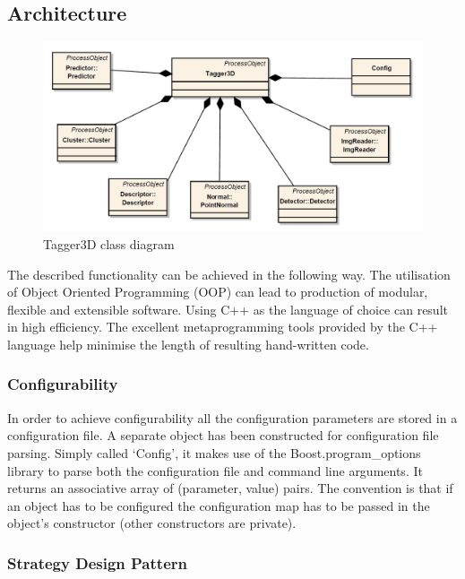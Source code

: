 	\subsection{Architecture}
	
	\begin{figure}[ht]
	\centering
	\includegraphics[width=1.0\textwidth]{figs/short}
	\caption{Tagger3D class diagram}
	\label{fig:class_diagram}
	\end{figure}
	
	The described functionality can be achieved in the following way. The utilisation of Object Oriented Programming (OOP) can lead to production of modular, flexible and extensible software. Using C++ as the language of choice can result in high efficiency. The excellent metaprogramming tools provided by the C++ language help minimise the length of resulting hand-written code.
	
	\subsubsection{Configurability}
	In order to achieve configurability all the configuration parameters are stored in a configuration file. A separate object has been constructed for configuration file parsing. Simply called `Config', it makes use of the Boost.program\_options library to parse both the configuration file and command line arguments. It returns an associative array of (parameter, value) pairs. The convention is that if an object has to be configured the configuration map has to be passed in the object's constructor (other constructors are private).
	
	\subsubsection{Strategy Design Pattern}
	
